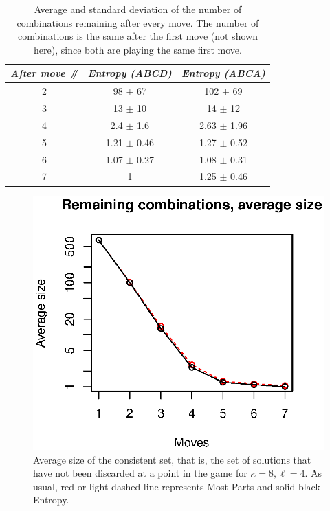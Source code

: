 \documentclass[preprint,12pt]{elsarticle}
\begin{document}
%
\begin{table}[!htb]
\centering
\caption{Average and standard deviation of the number of combinations
  remaining after every move. The number of combinations is the same after
  the  first move (not shown here), since both are playing the same
  first move.\label{tab:cset:me:48}}
\smallskip
\begin{tabular}{|c|c|c|}
\hline
\emph{After move \#} & \emph{Entropy (ABCD)} & \emph{Entropy (ABCA)} \\
\hline
2 & 98 $\pm$ 67 & 102 $\pm$ 69 \\
3 & 13 $\pm$ 10 & 14 $\pm$ 12 \\ 
4 & 2.4 $\pm$ 1.6 & 2.63 $\pm$ 1.96 \\
5 & 1.21 $\pm$ 0.46 & 1.27 $\pm$ 0.52\\
6 & 1.07 $\pm$ 0.27 & 1.08 $\pm$ 0.31 \\
7 & 1 & 1.25 $\pm$ 0.46 \\
\hline
\end{tabular}
\end{table}
%
\begin{figure}[!htb]
\centering
\includegraphics{csets-me-4-8.eps}
\caption{Average size of the consistent set, that is, the set of
  solutions that have not been discarded at a point in the game for
  $\kappa=8, \ell=4$. As usual, red or light dashed line 
  represents Most Parts and solid black Entropy. \label{fig:cset:me:48}}
\end{figure} 
%
\end{document}
